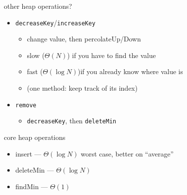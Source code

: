 \begin{frame}{other heap operations?}
\begin{itemize}
\item \texttt{decreaseKey}/\texttt{increaseKey}
    \begin{itemize}
    \item change value, then percolateUp/Down
    \item slow ($\Theta(N)$) if you have to find the value
    \item fast ($\Theta(\log N)$)if you already know where value is
    \item (one method: keep track of its index)
    \end{itemize}
\item \texttt{remove}
    \begin{itemize}
    \item \texttt{decreaseKey}, then \texttt{deleteMin}
    \end{itemize}
\end{itemize}
\end{frame}

\begin{frame}{core heap operations}
\begin{itemize}
\item insert --- $\Theta(\log N)$ worst case, better on ``average''
\item deleteMin --- $\Theta(\log N)$
\item findMin --- $\Theta(1)$
\end{itemize}
\end{frame}
